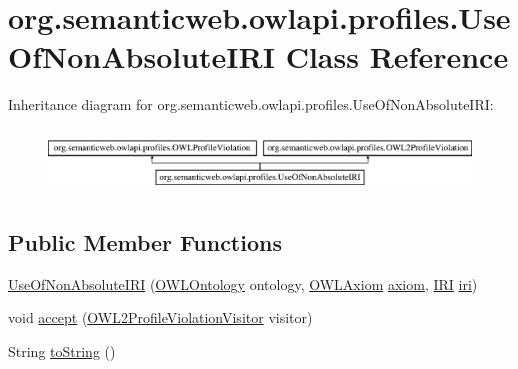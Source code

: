 \hypertarget{classorg_1_1semanticweb_1_1owlapi_1_1profiles_1_1_use_of_non_absolute_i_r_i}{\section{org.\-semanticweb.\-owlapi.\-profiles.\-Use\-Of\-Non\-Absolute\-I\-R\-I Class Reference}
\label{classorg_1_1semanticweb_1_1owlapi_1_1profiles_1_1_use_of_non_absolute_i_r_i}
}
Inheritance diagram for org.\-semanticweb.\-owlapi.\-profiles.\-Use\-Of\-Non\-Absolute\-I\-R\-I\-:\begin{figure}[H]
\begin{center}
\leavevmode
\includegraphics[height=1.717791cm]{classorg_1_1semanticweb_1_1owlapi_1_1profiles_1_1_use_of_non_absolute_i_r_i}
\end{center}
\end{figure}
\subsection*{Public Member Functions}
\begin{DoxyCompactItemize}
\item 
\hyperlink{classorg_1_1semanticweb_1_1owlapi_1_1profiles_1_1_use_of_non_absolute_i_r_i_aa2b811544c3d3631c8d5b6a389fe6832}{Use\-Of\-Non\-Absolute\-I\-R\-I} (\hyperlink{interfaceorg_1_1semanticweb_1_1owlapi_1_1model_1_1_o_w_l_ontology}{O\-W\-L\-Ontology} ontology, \hyperlink{interfaceorg_1_1semanticweb_1_1owlapi_1_1model_1_1_o_w_l_axiom}{O\-W\-L\-Axiom} \hyperlink{classorg_1_1semanticweb_1_1owlapi_1_1profiles_1_1_o_w_l_profile_violation_aa7c8e8910ed3966f64a2c003fb516214}{axiom}, \hyperlink{classorg_1_1semanticweb_1_1owlapi_1_1model_1_1_i_r_i}{I\-R\-I} \hyperlink{classorg_1_1semanticweb_1_1owlapi_1_1profiles_1_1_use_of_non_absolute_i_r_i_a3a40c37db0d708700946d78fd5c110d7}{iri})
\item 
void \hyperlink{classorg_1_1semanticweb_1_1owlapi_1_1profiles_1_1_use_of_non_absolute_i_r_i_ac6ee7c86342d1b35fcb4b184cd10e528}{accept} (\hyperlink{interfaceorg_1_1semanticweb_1_1owlapi_1_1profiles_1_1_o_w_l2_profile_violation_visitor}{O\-W\-L2\-Profile\-Violation\-Visitor} visitor)
\item 
String \hyperlink{classorg_1_1semanticweb_1_1owlapi_1_1profiles_1_1_use_of_non_absolute_i_r_i_a005bea69c2ad00cd6fa4ef994c50037e}{to\-String} ()
\end{DoxyCompactItemize}
